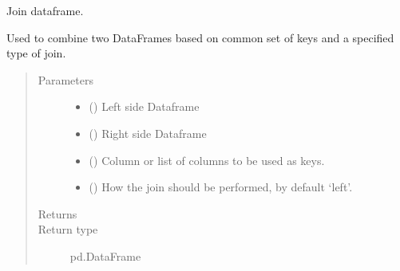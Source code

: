 \documentclass[letterpaper,10pt,english]{sphinxmanual}
\begin{document}
\begin{fulllineitems}
\label{\detokenize{source/optimization.datatools:optimization.datatools.dataprep.join}}
Join dataframe.

Used to combine two DataFrames based on common set of keys and a specified type of join.
\begin{quote}\begin{description}
\item[{Parameters}] \leavevmode\begin{itemize}
\item {} 
 () \textendash{} Left side Dataframe

\item {} 
 () \textendash{} Right side Dataframe

\item {} 
 (\sphinxstyleliteralemphasis{\sphinxupquote{{[}}}\sphinxstyleliteralemphasis{\sphinxupquote{, }}\sphinxstyleliteralemphasis{\sphinxupquote{{]}}}) \textendash{} Column or list of columns to be used as keys.

\item {} 
 () \textendash{} How the join should be performed, by default ‘left’.

\end{itemize}

\item[{Returns}] \leavevmode
{}

\item[{Return type}] \leavevmode
pd.DataFrame

\end{description}\end{quote}

\end{fulllineitems}
\end{document}

